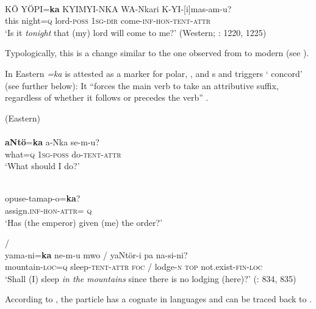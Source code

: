     \ex
    \\
    \gll KÖ  YÖPI=\textbf{{ka}} KYIMYI-NKA    WA-Nkari K-YI-[i]mas-am-u?\\
    this  night=\textsc{q}  lord-\textsc{poss}    1\textsc{sg}-\textsc{dir} come-\textsc{inf}-\textsc{hon}-\textsc{tent}-\textsc{attr}\\
    \glt ‘Is it \textit{tonight} that (my) lord will come to me?’ (Western; \citealt{Vovin2009}: 1220, 1225)
    \z
    \z

\noindent Typologically, this is a change similar to the one observed from  to modern  (see ).

In Eastern  \textit{=ka} is attested as a marker for polar, , and s and triggers \textit{} ‘ concord’ (see further below): It “forces the main verb to take an attributive suffix, regardless of whether it follows or precedes the verb” \citep[834]{Kupchik2011}.

\ea%
    \label{ex:japa:6}
     (Eastern)\\
    \ea
    \\
    \gll \textbf{{aNtö}}{=}\textbf{{ka}} a-Nka se-m-u?\\
    what=\textsc{q}  1\textsc{sg}-\textsc{poss}  do-\textsc{tent}-\textsc{attr}\\
    \glt ‘What should I do?’
    
    \ex
    \\
    \gll opuse-tamap-o=\textbf{{k}}\textbf{{a}}?\\
    assign.\textsc{inf}-\textsc{hon}-\textsc{attr=}  \textsc{q}\\
    \glt ‘Has (the emperor) given (me) the order?’
    
    \ex
    /\\
    \gll yama-ni=\textbf{{ka}} ne-m-u mwo  /  yaNtör-i pa na-si-ni?\\
    mountain-\textsc{loc=q}  sleep-\textsc{tent}-\textsc{attr}  \textsc{foc}  /  lodge-\textsc{n} \textsc{top}  not.exist-\textsc{fin}-\textsc{loc}\\
    \glt ‘Shall (I) sleep \textit{in the mountains} since there is no lodging (here)?’ (\citealt{Kupchik2011}: 834, 835)
    \z
    \z 

\noindent According to \citet[1229]{Vovin2009}, the particle has a cognate in  languages and can be traced back to .


